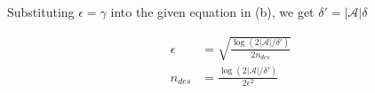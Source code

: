 \documentclass{article}
\begin{document}
\begin{enumerate}
Substituting $\epsilon=\gamma$ into the given equation in (b), we get $\delta' = |\mathcal{A}|\delta$

\begin{align*}
\epsilon &= \sqrt{\frac{\log(2|\mathcal A|/\delta')}{2n_{des}}} \\
n_{des} &= \frac{\log(2|\mathcal A|/\delta')}{2\epsilon^2}
\end{align*}

\end{enumerate}

\printbibliography
\end{document}
